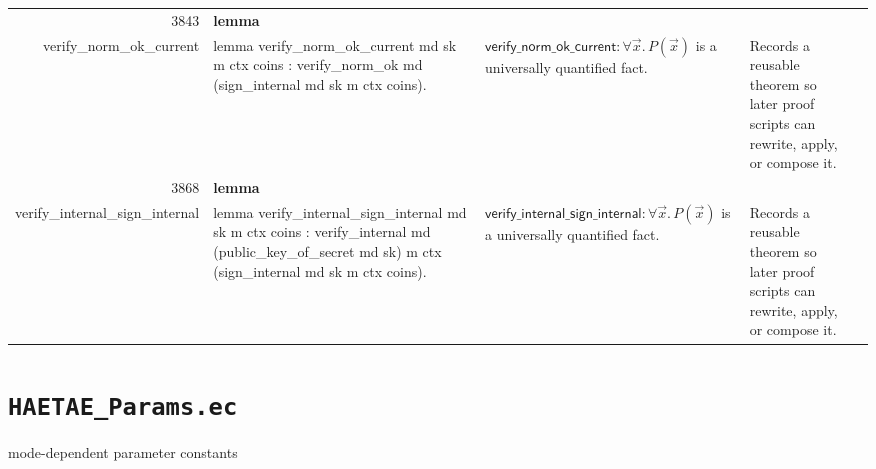 \documentclass[10pt]{article}
\newcommand{\ec}[1]{\begingroup\ttfamily\scriptsize #1\endgroup}
\begin{document}
\begin{longtable}{r L{0.17\textwidth} L{0.26\textwidth} L{0.27\textwidth} L{0.20\textwidth}}
3843 & \textbf{lemma}\\\ec{verify\_norm\_ok\_current} & \ec{lemma verify\_norm\_ok\_current md sk m ctx coins : verify\_norm\_ok md (sign\_internal md sk m ctx coins).} & \(\mathsf{verify\_norm\_ok\_current} : \forall \vec{x}.\, P(\vec{x})\) is a universally quantified fact. & Records a reusable theorem so later proof scripts can rewrite, apply, or compose it. \\
3868 & \textbf{lemma}\\\ec{verify\_internal\_sign\_internal} & \ec{lemma verify\_internal\_sign\_internal md sk m ctx coins : verify\_internal md (public\_key\_of\_secret md sk) m ctx (sign\_internal md sk m ctx coins).} & \(\mathsf{verify\_internal\_sign\_internal} : \forall \vec{x}.\, P(\vec{x})\) is a universally quantified fact. & Records a reusable theorem so later proof scripts can rewrite, apply, or compose it. \\
\bottomrule
\end{longtable}

\clearpage
\section{\texorpdfstring{\texttt{HAETAE\_Params.ec}}{HAETAE Params.ec}}
mode-dependent parameter constants
\end{document}
